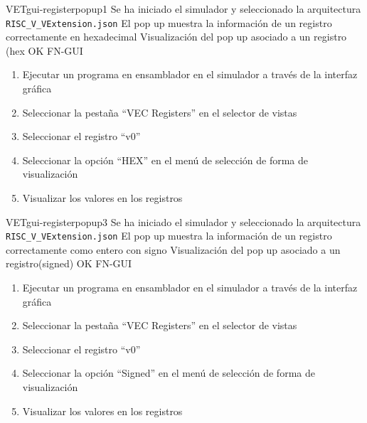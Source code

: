 \begin{testCase}{VET}{gui-registerpopup1}
    {Se ha iniciado el simulador y seleccionado la arquitectura \texttt{RISC\_V\_VExtension.json}}
    {El pop up muestra la información de un registro correctamente en hexadecimal}
    {Visualización del pop up asociado a un registro (hex} %
    {OK} %
    {FN-GUI}
    \begin{enumerate}
        \item Ejecutar un programa en ensamblador en el simulador a través de la interfaz gráfica
        \item Seleccionar la pestaña ``VEC Registers'' en el selector de vistas
        \item Seleccionar el registro ``v0''
        \item Seleccionar la opción ``HEX'' en el menú de selección de forma de visualización
        \item Visualizar los valores en los registros
    \end{enumerate}
\end{testCase}

\begin{testCase}{VET}{gui-registerpopup3}
    {Se ha iniciado el simulador y seleccionado la arquitectura \texttt{RISC\_V\_VExtension.json}}
    {El pop up muestra la información de un registro correctamente como entero con signo}
    {Visualización del pop up asociado a un registro(signed)} %
    {OK} %
    {FN-GUI}
    \begin{enumerate}
        \item Ejecutar un programa en ensamblador en el simulador a través de la interfaz gráfica
        \item Seleccionar la pestaña ``VEC Registers'' en el selector de vistas
        \item Seleccionar el registro ``v0''
        \item Seleccionar la opción ``Signed'' en el menú de selección de forma de visualización
        \item Visualizar los valores en los registros
    \end{enumerate}
\end{testCase}

